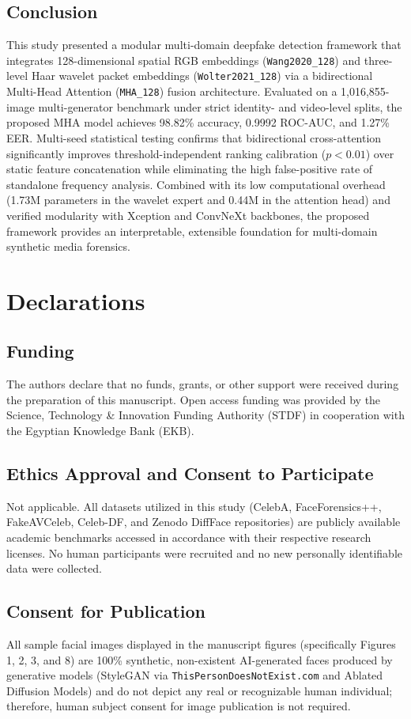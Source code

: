 \documentclass[fleqn,10pt]{wlscirep}
\begin{document}
\subsection*{Conclusion}
This study presented a modular multi-domain deepfake detection framework that integrates 128-dimensional spatial RGB embeddings (\texttt{Wang2020\_128}) and three-level Haar wavelet packet embeddings (\texttt{Wolter2021\_128}) via a bidirectional Multi-Head Attention (\texttt{MHA\_128}) fusion architecture. Evaluated on a 1,016,855-image multi-generator benchmark under strict identity- and video-level splits, the proposed MHA model achieves 98.82\% accuracy, 0.9992 ROC-AUC, and 1.27\% EER. Multi-seed statistical testing confirms that bidirectional cross-attention significantly improves threshold-independent ranking calibration ($p < 0.01$) over static feature concatenation while eliminating the high false-positive rate of standalone frequency analysis. Combined with its low computational overhead (1.73M parameters in the wavelet expert and 0.44M in the attention head) and verified modularity with Xception and ConvNeXt backbones, the proposed framework provides an interpretable, extensible foundation for multi-domain synthetic media forensics.

\section*{Declarations}
\subsection*{Funding}
The authors declare that no funds, grants, or other support were received during the preparation of this manuscript. Open access funding was provided by the Science, Technology \& Innovation Funding Authority (STDF) in cooperation with the Egyptian Knowledge Bank (EKB).

\subsection*{Ethics Approval and Consent to Participate}
Not applicable. All datasets utilized in this study (CelebA, FaceForensics++, FakeAVCeleb, Celeb-DF, and Zenodo DiffFace repositories) are publicly available academic benchmarks accessed in accordance with their respective research licenses. No human participants were recruited and no new personally identifiable data were collected.

\subsection*{Consent for Publication}
All sample facial images displayed in the manuscript figures (specifically Figures 1, 2, 3, and 8) are 100\% synthetic, non-existent AI-generated faces produced by generative models (StyleGAN via \texttt{ThisPersonDoesNotExist.com} and Ablated Diffusion Models) and do not depict any real or recognizable human individual; therefore, human subject consent for image publication is not required.
\end{document}

